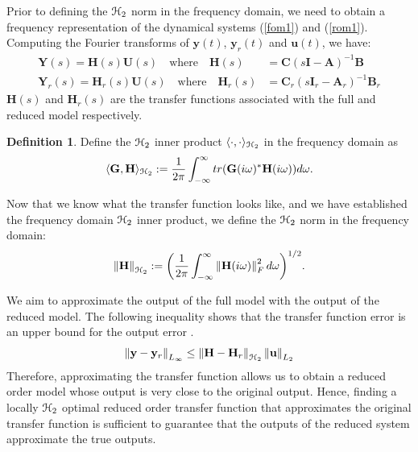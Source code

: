\documentclass[preprint]{elsarticle}
\theoremstyle{definition}
\theoremstyle{definition}
\def\mathcal{\EuScript}
\numberwithin{equation}{section}
\newtheorem{Definition}[Theorem]{Definition}
\newcommand{\A}{\mathbf{A}}
\newcommand{\Y}{\mathbf{Y}}
\newcommand{\B}{\mathbf{B}}
\newcommand{\I}{\mathbf{I}}
\newcommand{\G}{\mathbf{G}}
\newcommand{\C}{\mathbf{C}}
\newcommand{\U}{\mathbf{U}}
\newcommand{\y}{\mathbf{y}}
\newcommand{\uu}{\mathbf{u}}
\newcommand{\HH}{\mathbf{H}}
\newcommand{\ch}{\mathcal{H}}
\newcommand{\norm}[1]{\left\lVert#1\right\rVert}
\begin{document}
Prior to defining the $\ch_2$ norm in the frequency domain, we need to obtain a frequency representation of the dynamical systems (\ref{fom1}) and (\ref{rom1}). Computing the Fourier transforms of  $\y(t)$, $\y_r(t)$ and $\uu(t)$, we have:
\begin{align*}
\Y(s)= \HH(s) \U(s) \quad\mbox{where}\quad \HH(s) &=\C(s\I-\A)^{-1}\B\\
\Y_r(s)= \HH_r(s) \U(s) \quad\mbox{where}\quad \HH_r(s)&=\C_r(s\I_r-\A_r)^{-1}\B_r
\end{align*}
$\HH(s)$ and $\HH_r(s)$ are the transfer functions associated with the full and reduced model respectively. 
\begin{Definition}
Define the $\ch_2$ inner product $\langle \cdot, \cdot \rangle_{\ch_2}$ in the frequency domain as 
\begin{align*}
\langle \G, \HH \rangle_{\ch_2}:=\dfrac{1}{2\pi}\int_{-\infty}^\infty tr(\G(i\omega)^* \HH(i\omega)) d\omega. 
\end{align*}
\end{Definition}

Now that we know what the transfer function looks like, and we have established the frequency domain $\ch_2$ inner product, we define the $\ch_2$ norm in the frequency domain:
\begin{align*}
\norm{ \HH}_{\ch_2}:=\biggl(\dfrac{1}{2\pi} \int_{-\infty}^\infty \norm{\HH(i\omega)}_F^2 d\omega \biggr)^{1/2}.
\end{align*}

We aim to approximate the output of the full model with the output of the reduced model. The following inequality shows that the transfer function error is an upper bound for the output error \cite{AntBG10b}.
\begin{equation}
\begin{aligned}
\norm{\y-\y_r}_{L_\infty}\leq\norm{\HH-\HH_r}_{\ch_2}\norm{\uu}_{L_2}
\end{aligned}
\end{equation}
Therefore, approximating the transfer function allows us to obtain a reduced order model whose output is very close to the original output. Hence, finding a locally $\ch_2$ optimal reduced order transfer function that approximates the original transfer function is sufficient to guarantee that the outputs of the reduced system approximate the true outputs. 


\end{document}
